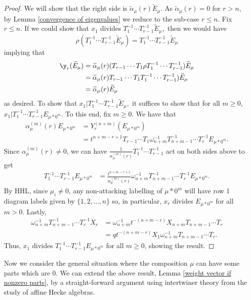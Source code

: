 \begin{proof}
We will show that the right side is $\widetilde{\alpha}_{\mu}(r)\widetilde{E}_{\mu}$.
As $\widetilde{\alpha}_{\mu}(r) = 0$ for $r > n$, by Lemma \ref{convergence of eigenvalues} we reduce to the sub-case $r \leq n$. Fix $r \leq n$. 
If we could show that $x_1$ divides $ T_1^{-1}\cdots T_{r-1}^{-1}\widetilde{E}_{\mu},$ then we would have $$\rho(T_1^{-1}\cdots T_{r-1}^{-1}\widetilde{E}_{\mu}) = T_1^{-1}\cdots T_{r-1}^{-1}\widetilde{E}_{\mu} $$
implying that 
\begin{align*}
\y_r(\widetilde{E}_{\mu}) &= \widetilde{\alpha}_{\mu}(r) (T_{r-1}\cdots T_1 \rho T_1^{-1}\cdots T_{r-1}^{-1}) \widetilde{E}_{\mu} \\
&= \widetilde{\alpha}_{\mu}(r) T_{r-1}\cdots T_1 T_1^{-1}\cdots T_{r-1}^{-1}) \widetilde{E}_{\mu} \\
&= \widetilde{\alpha}_{\mu}(r)\widetilde{E}_{\mu}
\end{align*}
as desired.
To show that $x_1 | T_1^{-1}\cdots T_{r-1}^{-1}\widetilde{E}_{\mu},$ it suffices to show that for all $m \geq 0$,
$x_1 | T_1^{-1}\cdots T_{r-1}^{-1} E_{\mu *0^m}$. To this end, fix $m \geq 0$. We have that 
\begin{align*}
\alpha_{\mu}^{(m)}(r)E_{\mu*0^m}&= Y_r^{(n+m)}(E_{\mu*0^m}) \\
&= t^{n+m-r+1}T_{r-1}\cdots T_1 \omega_{n+m}^{-1} T_{n+m-1}^{-1}\cdots T_r^{-1} E_{\mu*0^m}.
\end{align*}
Since $\alpha_{\mu}^{(m)}(r) \neq 0$, we can have $\frac{1}{\alpha_{\mu}^{(m)}(r)} T_1 ^{-1}\cdots T_{r-1}^{-1}$ act on both sides above to get 
\begin{align*}
T_1^{-1}\cdots T_{r-1}^{-1} E_{\mu*0^m} &= \frac{t^{n+m-r+1}}{\alpha_{\mu}^{(m)}(r)}\omega_{n+m}^{-1} T_{n+m-1}^{-1}\cdots T_r^{-1} E_{\mu*0^m}.
\end{align*}
 By HHL, since $\mu_i \neq 0$, any non-attacking labelling of $\mu* 0^m$ will have row 1 diagram labels given by $\{1,2,\ldots,n\}$ so, in particular, $x_r$ divides $E_{\mu*0^m}$ for all $m > 0$. Lastly, 
 \begin{align*}
\omega_{n+m}^{-1} T_{n+m-1}^{-1}\cdots T_r^{-1}X_r &= \omega_{n+m}^{-1} t^{-(n+m-r)}X_{n+m}T_{n+m-1}\cdots T_r \\
&= qt^{-(n+m-r)} X_1 \omega_{n+m}^{-1} T_{n+m-1}\cdots T_r.
 \end{align*}
Thus, $x_1$ divides $T_1^{-1}\cdots T_{r-1}^{-1} E_{\mu*0^m}$ for all $m \geq 0$, showing the result.
\end{proof}

Now we consider the general situation where the composition $\mu$ can have some parts which are 0. We can extend the above result, Lemma \ref{weight vector if nonzero parts}, by a straight-forward argument using intertwiner theory from the study of affine Hecke algebras.



